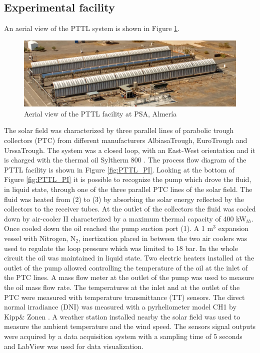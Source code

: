 \documentclass[final,3p,times,review]{elsarticle}
\begin{document}
\subsection{Experimental facility}
%
An aerial view of the PTTL system is shown in Figure \ref{fig:PTTL_photo}.
%
\begin{figure}[h!]
\centering
\includegraphics[width=1\textwidth]{Figures/SolarFieldTestRig_II.PNG}
\caption{Aerial view of the PTTL facility at PSA, Almer\' ia}
\label{fig:PTTL_photo}
\end{figure}
%
The solar field was characterized by three parallel lines of parabolic trough collectors (PTC) from different manufacturers AlbiasaTrough, EuroTrough and UrssaTrough. The system was a closed loop, with an East-West orientation and it is charged with the thermal oil Syltherm 800 \cite{DowOilandGas1997}. The process flow diagram of the PTTL facility is shown in Figure \ref{fig:PTTL_PI}. Looking at the bottom of Figure \ref{fig:PTTL_PI} it is possible to recognize the pump which drove the fluid, in liquid state, through one of the three parallel PTC lines of the solar field. The fluid was heated from (2) to (3) by absorbing the solar energy reflected by the collectors to the receiver tubes. At the outlet of the collectors the fluid was cooled down by air-cooler II characterized by a maximum thermal capacity of 400 kW$_{th}$. Once cooled down the oil reached the pump suction port (1). A 1 m$^3$ expansion vessel with Nitrogen, N$_\mathrm{2}$, inertization placed in between the two air coolers was used to regulate the loop pressure which was limited to 18 bar. In the whole circuit the oil was maintained in liquid state. Two electric heaters installed at the outlet of the pump allowed controlling the temperature of the oil at the inlet of the PTC lines. A mass flow meter at the outlet of the pump was used to measure the oil mass flow rate. The temperatures at the inlet and at the outlet of the PTC were measured with temperature transmittance (TT) sensors. The direct normal irradiance (DNI) was measured with a pyrheliometer model CH1 by Kipp\& Zonen \cite{Kipp1997}. A weather station installed nearby the solar field was used to measure the ambient temperature and the wind speed. The sensors signal outputs were acquired by a data acquisition system with a sampling time of 5 seconds and LabView was used for data visualization. 
\end{document}
